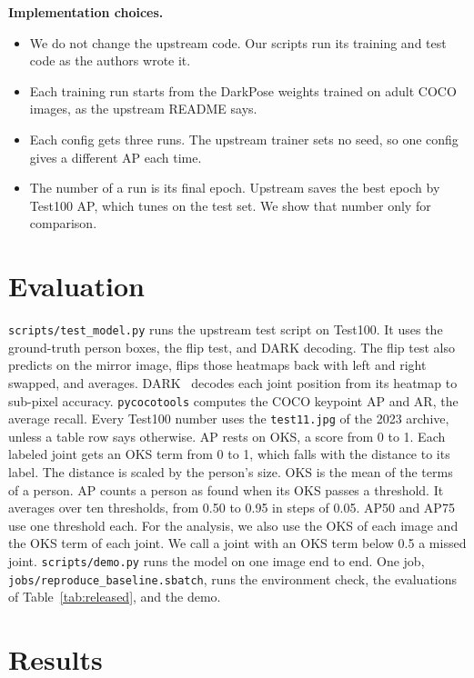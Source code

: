 \documentclass[11pt]{article}
\newcommand{\code}[1]{\texttt{#1}}
\begin{document}
\textbf{Implementation choices.}
\begin{itemize}
  \item We do not change the upstream code. Our scripts run its training and test code as the authors wrote it.
  \item Each training run starts from the DarkPose weights trained on adult COCO images, as the upstream README says.
  \item Each config gets three runs. The upstream trainer sets no seed, so one config gives a different AP each time.
  \item The number of a run is its final epoch. Upstream saves the best epoch by Test100 AP, which tunes on the test set. We show that number only for comparison.
\end{itemize}

\section{Evaluation}

\code{scripts/test\_model.py} runs the upstream test script on Test100.
It uses the ground-truth person boxes, the flip test, and DARK decoding.
The flip test also predicts on the mirror image, flips those heatmaps back with left and right swapped, and averages.
DARK~\cite{zhang2020dark} decodes each joint position from its heatmap to sub-pixel accuracy.
\code{pycocotools} computes the COCO keypoint AP and AR, the average recall.
Every Test100 number uses the \code{test11.jpg} of the 2023 archive, unless a table row says otherwise.
AP rests on OKS, a score from 0 to 1.
Each labeled joint gets an OKS term from 0 to 1, which falls with the distance to its label.
The distance is scaled by the person's size. OKS is the mean of the terms of a person.
AP counts a person as found when its OKS passes a threshold.
It averages over ten thresholds, from 0.50 to 0.95 in steps of 0.05. AP50 and AP75 use one threshold each.
For the analysis, we also use the OKS of each image and the OKS term of each joint.
We call a joint with an OKS term below 0.5 a missed joint.
\code{scripts/demo.py} runs the model on one image end to end.
One job, \code{jobs/reproduce\_baseline.sbatch}, runs the environment check, the evaluations of Table~\ref{tab:released}, and the demo.

\section{Results}
\end{document}
